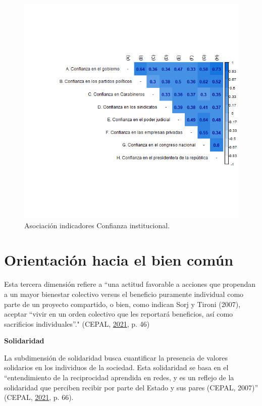 \documentclass[
  12pt,
]{book}
\begin{document}
\begin{figure}[H]

{\centering \includegraphics[width=1\linewidth,height=1\textheight]{output/graphs/confianza-institucional_cor} 

}

\caption{Asociación indicadores Confianza institucional.}\label{fig:confianza-institucional-cor}
\end{figure}

\hypertarget{orientaciuxf3n-hacia-el-bien-comuxfan}{%
\section{Orientación hacia el bien común}\label{orientaciuxf3n-hacia-el-bien-comuxfan}}

Esta tercera dimensión refiere a ``una actitud favorable a acciones que propendan a un mayor bienestar colectivo versus el beneficio puramente individual como parte de un proyecto compartido, o bien, como indican Sorj y Tironi (2007), aceptar ``vivir en un orden colectivo que les reportará beneficios, así como sacrificios individuales''." (CEPAL, \protect\hyperlink{ref-cepal_Cohesion_2021}{2021}, p. 46)

\textbf{Solidaridad}

La subdimensión de solidaridad busca cuantificar la presencia de valores solidarios en los individuos de la sociedad. Esta solidaridad se basa en el ``entendimiento de la reciprocidad aprendida en redes, y es un reflejo de la solidaridad que perciben recibir por parte del Estado y sus pares (CEPAL, 2007)'' (CEPAL, \protect\hyperlink{ref-cepal_Cohesion_2021}{2021}, p. 66).
\end{document}
